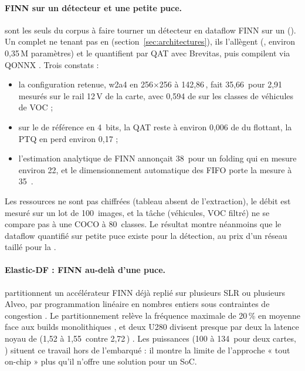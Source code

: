 \paragraph{FINN sur un détecteur et une petite puce.}
\citet{arxiv-2609.24757-npu-accelerator-quantized-real-time}\pp{} sont les seuls du
corpus à faire tourner un détecteur en dataflow FINN sur un  (). Un
 complet ne tenant pas en  (section~\ref{sec:architectures}), ils
l'allègent (, environ 0,35\,M paramètres) et le quantifient par QAT avec Brevitas,
puis compilent via QONNX . Trois constats :
\begin{itemize}
  \item la configuration retenue, w2a4 en 256$\times$256 à 142,86\,, fait 35,66\,
    pour 2,91\, mesurés sur le rail 12\,V de la carte, avec 0,594 de  sur les
    classes de véhicules de VOC  ;
  \item sur le  de référence en 4~bits, la QAT reste à environ 0,006 de  du
    flottant, la PTQ en perd environ 0,17  ;
  \item l'estimation analytique de FINN annonçait 38\, pour un folding qui en mesure
    environ 22, et le dimensionnement automatique des FIFO porte la mesure à 35\,
    .
\end{itemize}
Les ressources ne sont pas chiffrées (tableau absent de l'extraction), le débit est mesuré
sur un lot de 100~images, et la tâche (véhicules, VOC filtré) ne se compare pas à une 
COCO à 80~classes. Le résultat montre néanmoins que le dataflow quantifié sur petite puce
existe pour la détection, au prix d'un réseau taillé pour la .

\paragraph{Elastic-DF : FINN au-delà d'une puce.}
\citet{2021-alonso-elastic-df-scaling-performance-dnn} partitionnent un accélérateur FINN
déjà replié sur plusieurs SLR ou plusieurs Alveo, par programmation linéaire en nombres
entiers sous contraintes de congestion . Le partitionnement relève la fréquence
maximale de 20\,\% en moyenne face aux builds monolithiques , et deux U280
divisent presque par deux la latence noyau de  (1,52 à 1,55\, contre 2,72\,)
. Les puissances (100 à 134\, pour deux cartes, ) situent ce
travail hors de l'embarqué : il montre la limite de l'approche « tout on-chip » plus qu'il
n'offre une solution pour un SoC.

